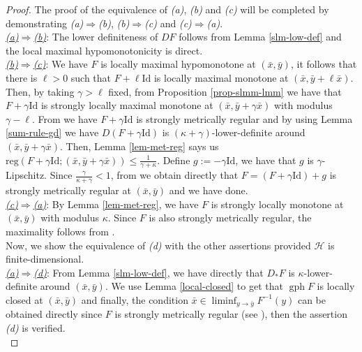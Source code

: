 \documentclass[smallextended,envcountsect,envcountsame]{svjour3}
\renewcommand{\H}{\mathcal{H}}
\newcommand{\gph}{\operatorname{gph}}
\newcommand{\1}{\mathds{1}}
\begin{document}
	\begin{proof} The proof of the equivalence of \emph{(a)}, \emph{(b)} and \emph{(c)} will be completed by demonstrating \emph{(a)}$\Rightarrow$\emph{(b)}, \emph{(b)}$\Rightarrow$\emph{(c)} and \emph{(c)}$\Rightarrow$\emph{(a)}.\\
		\underline{\emph{(a)}$\Rightarrow$\emph{(b)}}: The lower definiteness of $DF$ follows from Lemma \ref{slm-low-def} and the local maximal hypomonotonicity is direct.\\
		\underline{\emph{(b)}$\Rightarrow$\emph{(c)}}: We have $F$ is locally maximal hypomonotone at $(\bar x,\bar y)$, it follows that there is $\ell>0$ such that $F+\ell\text{Id}$ is locally maximal monotone at $(\bar x,\bar y+\ell\bar x)$. Then, by taking $\gamma>\ell$ fixed, from Proposition \ref{prop-slmm-lmm} we have that $F+\gamma\text{Id}$ is strongly locally maximal monotone at $(\bar x,\bar y+\gamma\bar x)$ with modulus $\gamma-\ell$. From \cite[Lemma 6.8]{MR4769808} we have $F+\gamma\text{Id}$ is strongly metrically regular and by using Lemma \ref{sum-rule-gd} we have $D(F+\gamma\text{Id})$ is $(\kappa+\gamma)$-lower-definite around $(\bar x,\bar y+\gamma\bar x)$. Then, Lemma \ref{lem-met-reg} says us $\text{reg}(F+\gamma\text{Id};(\bar x,\bar y+\gamma\bar x))\leq \frac{1}{\gamma+\kappa}$. Define $g:= -\gamma\text{Id}$, we have that $g$ is $\gamma$-Lipschitz. Since $\frac{\gamma}{\kappa+\gamma}<1$, from \cite[Lemma 5F.1]{MR3288139} we obtain directly that $F = (F+\gamma\text{Id})+g$ is strongly metrically regular at $(\bar x, \bar y)$ and we have done.
		\\
		\underline{\emph{(c)}$\Rightarrow$\emph{(a)}}: By Lemma \ref{lem-met-reg}, we have $F$ is strongly locally monotone at $(\bar x,\bar y)$ with modulus $\kappa$. Since $F$ is also strongly metrically regular, the maximality follows from \cite[Lemma 6.8]{MR4769808}.\\
		Now, we show the equivalence of \emph{(d)} with the other assertions provided $\H$ is finite-dimensional.\\
    \underline{\emph{(a)}$\Rightarrow$\emph{(d)}}:  From Lemma \ref{slm-low-def}, we have directly that $D_\ast F$ is $\kappa$-lower-definite around $(\bar x,\bar y)$. We use Lemma \ref{local-closed} to get that $\gph F$ is locally closed at $(\bar x,\bar y)$ and finally, the condition $\bar x\in \liminf_{y\to \bar y}F^{-1}(y)$ can be obtained directly since $F$ is strongly metrically regular (see \cite[Lemma 6.8]{MR4769808}), then the assertion \emph{(d)} is verified.\\

\end{proof}
\end{document}
